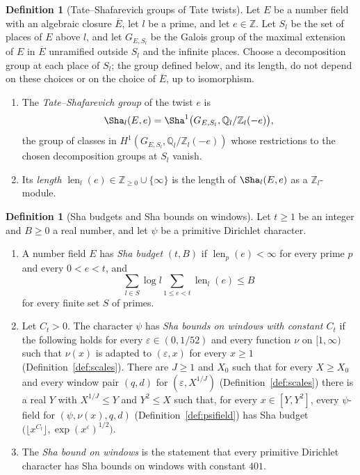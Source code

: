\documentclass[11pt]{amsbook}
\theoremstyle{plain}
\theoremstyle{definition}
\newtheorem{definition}[theorem]{Definition}
\theoremstyle{remark}
\numberwithin{equation}{section}
\numberwithin{figure}{chapter}
\numberwithin{table}{chapter}
\newcommand{\Q}{\mathbb{Q}}
\newcommand{\Z}{\mathbb{Z}}
\newcommand{\eps}{\varepsilon}
\newcommand{\shalen}{\operatorname{len}}
\begin{document}
\begin{definition}[Tate--Shafarevich groups of Tate twists]
\label{def:sha}
Let $E$ be a number field with an algebraic closure $\overline E$, let
$l$ be a prime, and let $e\in\Z$. Let $S_l$ be the set of places of
$E$ above $l$, and let $G_{E,S_l}$ be the Galois group of the maximal
extension of $E$ in $\overline E$ unramified outside $S_l$ and the
infinite places. Choose a decomposition group at each place of $S_l$;
the group defined below, and its length, do not depend on these
choices or on the choice of $\overline E$, up to isomorphism.
\begin{enumerate}[label=(\arabic*)]
\item The \emph{Tate--Shafarevich group} of the twist $e$ is
\[
\Sha_l(E,e)=\Sha^1\bigl(G_{E,S_l},\Q_l/\Z_l(-e)\bigr),
\]
the group of classes in $H^1(G_{E,S_l},\Q_l/\Z_l(-e))$ whose
restrictions to the chosen decomposition groups at $S_l$ vanish.
\item Its \emph{length} $\shalen_l(e)\in\Z_{\ge0}\cup\{\infty\}$ is the
length of $\Sha_l(E,e)$ as a $\Z_l$-module.
\end{enumerate}
\end{definition}

\begin{definition}[Sha budgets and Sha bounds on windows]
\label{def:sha-windows}
Let $t\ge1$ be an integer and $B\ge0$ a real number, and let $\psi$
be a primitive Dirichlet character.
\begin{enumerate}[label=(\arabic*)]
\item A number field $E$ has \emph{Sha budget} $(t,B)$ if
$\shalen_p(e)<\infty$ for every prime $p$ and every
$0<e<t$, and
\[
\sum_{l\in S}\log l\sum_{1\le e<t}\shalen_l(e)\le B
\]
for every finite set $S$ of primes.
\item Let $C_t>0$. The character $\psi$ has \emph{Sha bounds on windows
with constant $C_t$} if the following holds for every
$\eps\in(0,1/52)$ and every function $\nu$ on $[1,\infty)$ such that
$\nu(x)$ is adapted to $(\eps,x)$ for every $x\ge1$
(Definition~\ref{def:scales}). There are $J\ge1$ and $X_0$ such that
for every $X\ge X_0$ and every window pair $(q,d)$ for
$(\eps,X^{1/J})$ (Definition~\ref{def:scales}) there is a real $Y$
with $X^{1/J}\le Y$ and $Y^2\le X$ such that, for every
$x\in[Y,Y^2]$, every $\psi$-field for $(\psi,\nu(x),q,d)$
(Definition~\ref{def:psifield}) has Sha budget
$\bigl(\lfloor x^{C_t}\rfloor,\exp(x^\eps)^{1/2}\bigr)$.
\item The \emph{Sha bound on windows} is the statement that every
primitive Dirichlet character has Sha bounds on windows with constant
$401$.
\end{enumerate}
\end{definition}
\end{document}
